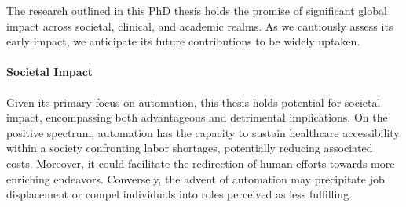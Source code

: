 


The research outlined in this PhD thesis holds the promise of significant global impact across societal, clinical, and academic realms.
As we cautiously assess its early impact, we anticipate its future contributions to be widely uptaken.

\paragraph{Societal Impact} Given its primary focus on automation, this thesis holds potential for societal impact, encompassing both advantageous and detrimental implications. On the positive spectrum, automation has the capacity to sustain healthcare accessibility within a society confronting labor shortages, potentially reducing associated costs. Moreover, it could facilitate the redirection of human efforts towards more enriching endeavors. Conversely, the advent of automation may precipitate job displacement or compel individuals into roles perceived as less fulfilling.

